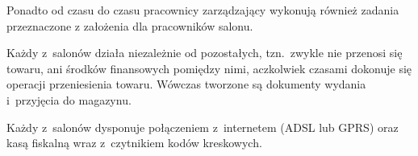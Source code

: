 Ponadto od czasu do czasu pracownicy zarządzający wykonują również zadania przeznaczone z założenia dla pracowników salonu.

Każdy z~salonów działa niezależnie od pozostałych, tzn.\ zwykle nie przenosi się towaru, ani środków finansowych pomiędzy nimi, aczkolwiek czasami dokonuje się operacji przeniesienia towaru. Wówczas tworzone są dokumenty wydania i~przyjęcia do magazynu.

Każdy z~salonów dysponuje połączeniem z~internetem (ADSL lub GPRS) oraz kasą fiskalną wraz z~czytnikiem kodów kreskowych.

